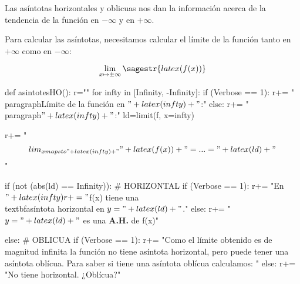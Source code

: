 \ifverbose
Las asíntotas horizontales y oblicuas nos dan la información acerca de la tendencia de la función en $-\infty$ y en $+\infty$.

Para calcular las asíntotas, necesitamos calcular el límite de la función tanto en $+\infty$ como en $-\infty$:
\fi

\[\lim_{x\mapsto \pm\infty} \sagestr{latex(f(x))} \]

\begin{sagesilent}
def asintotesHO():
    r=""
    for infty in [Infinity, -Infinity]:
        if (Verbose == 1):
            r+= "\\paragraph{Límite de la función en $"+latex(infty)+"$:}"
        else:
            r+= "\\paragraph{$"+latex(infty)+"$:}"
        ld=limit(f, x=infty)  

        r+= "\[\\lim_{x\\mapsto "+latex(infty)+"}" + latex(f(x)) + "= ... = "+latex(ld)+"\]"    

        if (not (abs(ld) == Infinity)): # HORIZONTAL
            if (Verbose == 1):
                r+= "En $"+latex(infty)
                r+= "$f(x) tiene una \\textbf{asíntota horizontal} en $y = "+latex(ld)+"$."
            else:
                r+= "$y = "+latex(ld) +" $ es una \textbf{A.H.} de f(x)"

        else: # OBLICUA
            if (Verbose == 1):
                r+= "Como el límite obtenido es de magnitud infinita la función no tiene asíntota horizontal, pero puede tener una asíntota oblícua. Para saber si tiene una asíntota oblícua calculamos: "
            else:
                r+= "No tiene horizontal. ¿Oblícua?"


\end{sagesilent}
